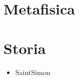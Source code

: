 \documentclass[letterpaper,10pt,italian]{jupyterBook}
\begin{document}
\section{Metafisica}
\label{\detokenize{ch/topics:metafisica}}

\section{Storia}
\label{\detokenize{ch/topics:storia}}\begin{itemize}
\item {} 
\sphinxAtStartPar
Saint\sphinxhyphen{}Simon

\end{itemize}







\renewcommand{\indexname}{Indice}
\printindex
\end{document}
